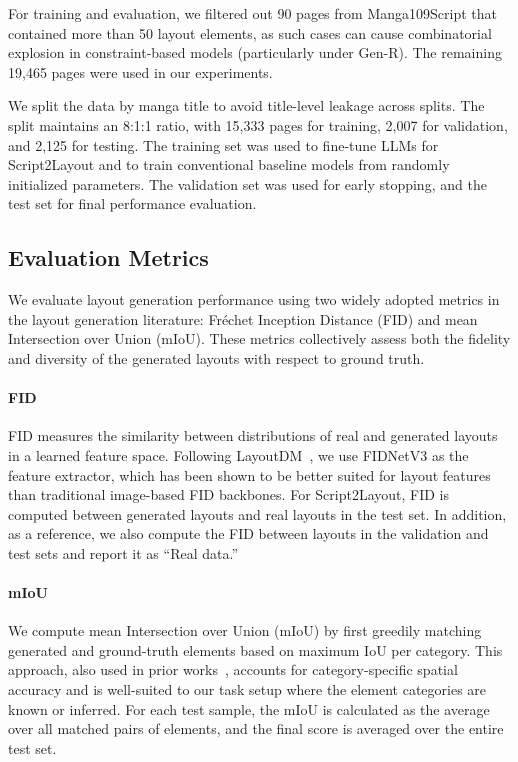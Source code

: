 \documentclass[sigconf, screen, review, anonymous]{acmart}
\begin{document}
For training and evaluation, we filtered out 90 pages from Manga109Script that contained more than 50 layout elements, as such cases can cause combinatorial explosion in constraint-based models (particularly under Gen-R). The remaining 19,465 pages were used in our experiments.

We split the data by manga title to avoid title-level leakage across splits. The split maintains an 8:1:1 ratio, with 15,333 pages for training, 2,007 for validation, and 2,125 for testing. The training set was used to fine-tune LLMs for Script2Layout and to train conventional baseline models from randomly initialized parameters. The validation set was used for early stopping, and the test set for final performance evaluation.

\subsection{Evaluation Metrics}

We evaluate layout generation performance using two widely adopted metrics in the layout generation literature: Fréchet Inception Distance (FID) and mean Intersection over Union (mIoU). These metrics collectively assess both the fidelity and diversity of the generated layouts with respect to ground truth.

\paragraph{FID}
FID measures the similarity between distributions of real and generated layouts in a learned feature space. Following LayoutDM~\cite{inoue2023layoutdm}, we use FIDNetV3 as the feature extractor, which has been shown to be better suited for layout features than traditional image-based FID backbones. For Script2Layout, FID is computed between generated layouts and real layouts in the test set. In addition, as a reference, we also compute the FID between layouts in the validation and test sets and report it as “Real data.”

\paragraph{mIoU}
We compute mean Intersection over Union (mIoU) by first greedily matching generated and ground-truth elements based on maximum IoU per category. This approach, also used in prior works~\cite{inoue2023layoutdm}, accounts for category-specific spatial accuracy and is well-suited to our task setup where the element categories are known or inferred. For each test sample, the mIoU is calculated as the average over all matched pairs of elements, and the final score is averaged over the entire test set.
\end{document}
